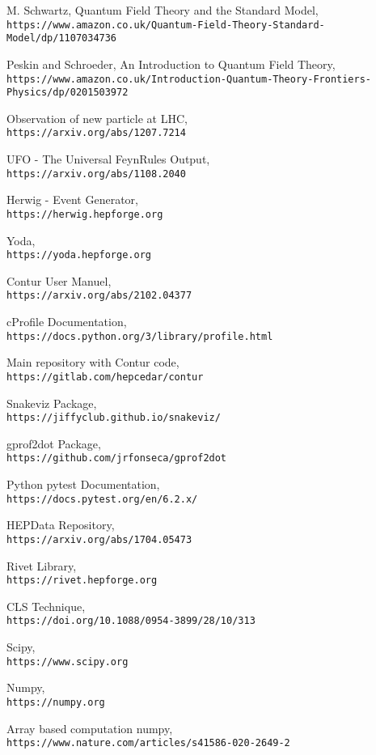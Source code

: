 \documentclass[12pt,phd,a4paper,oneside]{ucl_thesis}
\begin{document}
\begin{thebibliography}{9}
M. Schwartz, Quantum Field Theory and the Standard Model,
\\\texttt{https://www.amazon.co.uk/Quantum-Field-Theory-Standard-Model/dp/1107034736}

Peskin and Schroeder, An Introduction to Quantum Field Theory,
\\\texttt{https://www.amazon.co.uk/Introduction-Quantum-Theory-Frontiers-Physics/dp/0201503972}

Observation of new particle at LHC,
\\\texttt{https://arxiv.org/abs/1207.7214}

UFO - The Universal FeynRules Output,
\\\texttt{https://arxiv.org/abs/1108.2040}

Herwig - Event Generator,
\\\texttt{https://herwig.hepforge.org}

Yoda,
\\\texttt{https://yoda.hepforge.org}

Contur User Manuel,
\\\texttt{https://arxiv.org/abs/2102.04377}

cProfile Documentation,
\\\texttt{https://docs.python.org/3/library/profile.html}

Main repository with Contur code,
\\\texttt{https://gitlab.com/hepcedar/contur}

Snakeviz Package,
\\\texttt{https://jiffyclub.github.io/snakeviz/}

gprof2dot Package,
\\\texttt{https://github.com/jrfonseca/gprof2dot}

Python pytest Documentation,
\\\texttt{https://docs.pytest.org/en/6.2.x/}

HEPData Repository,
\\\texttt{https://arxiv.org/abs/1704.05473}

Rivet Library,
\\\texttt{https://rivet.hepforge.org}

CLS Technique,
\\\texttt{https://doi.org/10.1088/0954-3899/28/10/313}

Scipy,
\\\texttt{https://www.scipy.org}

Numpy,
\\\texttt{https://numpy.org}

Array based computation numpy,
\\\texttt{https://www.nature.com/articles/s41586-020-2649-2}

\end{thebibliography}

\end{document}
